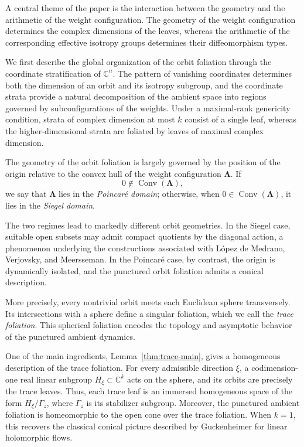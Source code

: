 \documentclass[11pt]{amsart}
\theoremstyle{definition}
\theoremstyle{remark}
\newcommand{\C}{\mathbb{C}}
\newcommand{\Lam}{\pmb{\Lambda}}
\begin{document}
A central theme of the paper is the interaction between the geometry and the arithmetic of the weight configuration.
The geometry of the weight configuration determines the complex dimensions of the leaves, whereas the arithmetic of the corresponding effective isotropy groups determines their diffeomorphism types.

We first describe the global organization of the orbit foliation through the coordinate stratification of $\C^n$.
The pattern of vanishing coordinates determines both the dimension of an orbit and its isotropy subgroup, and the coordinate strata provide a natural decomposition of the ambient space into regions governed by subconfigurations of the weights.
Under a maximal-rank genericity condition, strata of complex dimension at most $k$ consist of a single leaf, whereas the higher-dimensional strata are foliated by leaves of maximal complex dimension.

The geometry of the orbit foliation is largely governed by the position of the origin relative to the convex hull of the weight configuration $\Lam$.
If
\[
	0\notin\operatorname{Conv}(\Lam),
\]
we say that $\Lam$ lies in the \emph{Poincaré domain}; otherwise, when $0\in\operatorname{Conv}(\Lam)$, it lies in the \emph{Siegel domain}.

The two regimes lead to markedly different orbit geometries.
In the Siegel case, suitable open subsets may admit compact quotients by the diagonal action, a phenomenon underlying the constructions associated with L\'opez de Medrano, Verjovsky, and Meersseman.
In the Poincaré case, by contrast, the origin is dynamically isolated, and the punctured orbit foliation admits a conical description.

More precisely, every nontrivial orbit meets each Euclidean sphere transversely.
Its intersections with a sphere define a singular foliation, which we call the \emph{trace foliation}.
This spherical foliation encodes the topology and asymptotic behavior of the punctured ambient dynamics.

One of the main ingredients, Lemma~\ref{thm:trace-main}, gives a homogeneous description of the trace foliation.
For every admissible direction $\xi$, a codimension-one real linear subgroup $H_\xi\subset\C^k$ acts on the sphere, and its orbits are precisely the trace leaves.
Thus, each trace leaf is an immersed homogeneous space of the form $H_\xi/\Gamma_z$, where $\Gamma_z$ is its stabilizer subgroup.
Moreover, the punctured ambient foliation is homeomorphic to the open cone over the trace foliation.
When $k=1$, this recovers the classical conical picture described by Guckenheimer \cite{Gu} for linear holomorphic flows.
\end{document}

